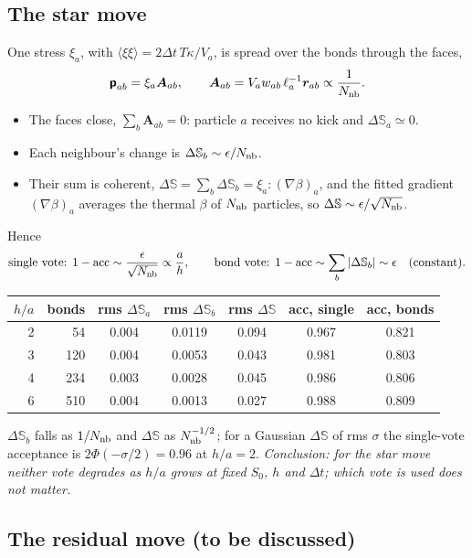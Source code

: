 \documentclass[11pt,aps,preprint,nofootinbib,superscriptaddress,tightenlines]{revtex4-2}
\def\st{\begin{equation}}
\def\stp{\end{equation}}
\newcommand{\avg}[1]{\langle #1\rangle}
\begin{document}
\subsection{The star move}

One stress $\xi_a$, with $\avg{\xi\xi}=2\Delta t\,T\kappa/V_a$, is spread over the bonds
through the faces,
\st
\bm{\mathsf p}_{ab}=\xi_a\bm A_{ab},\qquad \bm A_{ab}=V_aw_{ab}\,\ell_a^{-1}\bm r_{ab}\propto\frac{1}{N_{\rm nb}} .
\stp
\begin{itemize}
\item The faces close, $\sum_b\bm A_{ab}=0$: particle $a$ receives no kick and
  $\Delta\mathbb S_a\simeq0$.
\item Each neighbour's change is $\Delta\mathbb S_b\sim\epsilon/N_{\rm nb}$.
\item Their sum is coherent, $\Delta\mathbb S=\sum_b\Delta\mathbb S_b=\xi_a{:}(\nabla\beta)_a$, and the fitted
  gradient $(\nabla\beta)_a$ averages the thermal $\beta$ of $N_{\rm nb}$ particles, so
  $\Delta\mathbb S\sim\epsilon/\sqrt{N_{\rm nb}}$.
\end{itemize}
Hence
\st
\text{single vote: }1-\text{acc}\sim\frac{\epsilon}{\sqrt{N_{\rm nb}}}\propto\frac ah,\qquad
\text{bond vote: }1-\text{acc}\sim\sum_b|\Delta\mathbb S_b|\sim\epsilon\quad(\text{constant}).
\stp
\begin{center}
\begin{tabular}{rr|ccc|cc}
$h/a$ & bonds & rms $\Delta\mathbb S_a$ & rms $\Delta\mathbb S_b$ & rms $\Delta\mathbb S$ & acc, single & acc, bonds \\ \hline
2 &  54 & 0.004 & 0.0119 & 0.094 & 0.967 & 0.821 \\
3 & 120 & 0.004 & 0.0053 & 0.043 & 0.981 & 0.803 \\
4 & 234 & 0.003 & 0.0028 & 0.045 & 0.986 & 0.806 \\
6 & 510 & 0.004 & 0.0013 & 0.027 & 0.988 & 0.809
\end{tabular}
\end{center}
$\Delta\mathbb S_b$ falls as $1/N_{\rm nb}$ and $\Delta\mathbb S$ as $N_{\rm nb}^{-1/2}$; for a Gaussian $\Delta\mathbb S$ of
rms $\sigma$ the single-vote acceptance is $2\Phi(-\sigma/2)=0.96$ at $h/a=2$.
\emph{Conclusion: for the star move neither vote degrades as $h/a$ grows at fixed
$S_0$, $h$ and $\Delta t$; which vote is used does not matter.}

\subsection{The residual move (to be discussed)}
\end{document}
